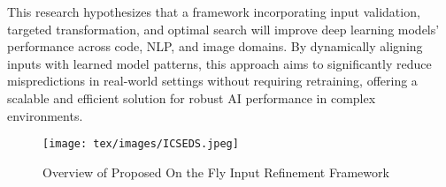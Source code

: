 

This research hypothesizes that a framework incorporating input validation, targeted transformation, and optimal search will improve deep learning models' performance across code, NLP, and image domains. By dynamically aligning inputs with learned model patterns, this approach aims to significantly reduce mispredictions in real-world settings without requiring retraining, offering a scalable and efficient solution for robust AI performance in complex environments.

\begin{figure*}[!htbp]
\centering
\texttt{[image: tex/images/ICSEDS.jpeg]}
\caption{Overview of Proposed On the Fly Input Refinement Framework} 
\label{fig:Overview}
\end{figure*}






